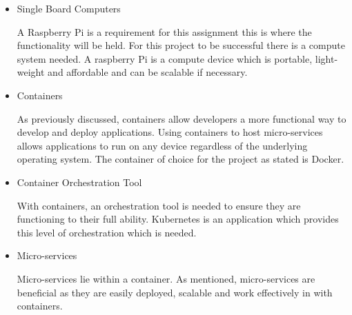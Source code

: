 \begin{itemize}
    \item Single Board Computers
    
    A Raspberry Pi is a requirement for this assignment this is where the functionality will be held. For this project to be successful there is a compute system needed. A raspberry Pi is a compute device which is portable, light-weight and affordable and can be scalable if necessary.
    
    \item Containers
    
    As previously discussed, containers allow developers a more functional way to develop and deploy applications. Using containers to host micro-services allows applications to run on any device regardless of the underlying operating system. The container of choice for the project as stated is Docker.
    
    \item Container Orchestration Tool
    
    With containers, an orchestration tool is needed to ensure they are functioning to their full ability. Kubernetes is an application which provides this level of orchestration which is needed.
    
    \item Micro-services
    
    Micro-services lie within a container. As mentioned, micro-services are beneficial as they are easily deployed, scalable and work effectively in with containers. 
    
\end{itemize}




